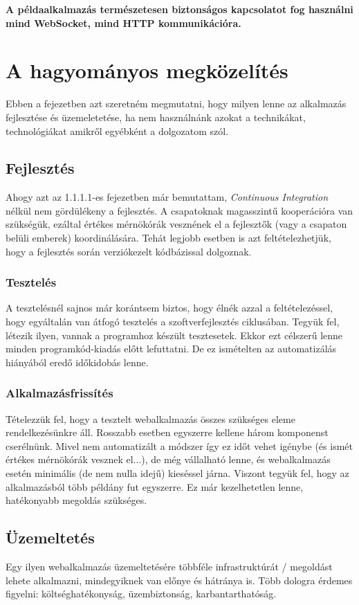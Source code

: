 \textbf{A példaalkalmazás természetesen biztonságos kapcsolatot fog használni mind WebSocket, mind HTTP kommunikációra.}
\section{A hagyományos megközelítés}
Ebben a fejezetben azt szeretném megmutatni, hogy milyen lenne az alkalmazás fejlesztése és üzemeletetése, ha nem használnánk azokat a technikákat, technológiákat amikről egyébként a dolgozatom szól.
\subsection{Fejlesztés}
Ahogy azt az 1.1.1.1-es fejezetben már bemutattam, \textit{Continuous Integration} nélkül nem gördülékeny a fejlesztés. A csapatoknak magasszintű kooperációra van szükségük, ezáltal értékes mérnökórák vesznének el a fejlesztők (vagy a csapaton belüli emberek) koordinálására. Tehát legjobb esetben is azt feltételezhetjük, hogy a fejlesztés során verziókezelt kódbázissal dolgoznak.
\subsubsection{Tesztelés}
A tesztelésnél sajnos már korántsem biztos, hogy élnék azzal a feltételezéssel, hogy egyáltalán van átfogó tesztelés a szoftverfejlesztés ciklusában. Tegyük fel, létezik ilyen, vannak a programhoz készült tesztesetek. Ekkor ezt célszerű lenne minden programkód-kiadás előtt lefuttatni. De ez ismételten az automatizálás hiányából eredő időkidobás lenne. 
\subsubsection{Alkalmazásfrissítés}
Tételezzük fel, hogy a tesztelt webalkalmazás összes szükséges eleme rendelkezésünkre áll. Rosszabb esetben egyszerre kellene három komponenst cserélnünk. Mivel nem automatizált a módszer így ez időt vehet igénybe (és ismét értékes mérnökórák vesznek el...), de még vállalható lenne, és webalkalmazás esetén minimális (de nem nulla idejű) kieséssel járna. Viszont tegyük fel, hogy az alkalmazásból több példány fut egyszerre. Ez már kezelhetetlen lenne, hatékonyabb megoldás szükséges.
\subsection{Üzemeltetés}
Egy ilyen webalkalmazás üzemeltetésére többféle infrastruktúrát / megoldást lehete alkalmazni, mindegyiknek van előnye és hátránya is. Több dologra érdemes figyelni: költséghatékonyság, üzembiztonság, karbantarthatóság.
